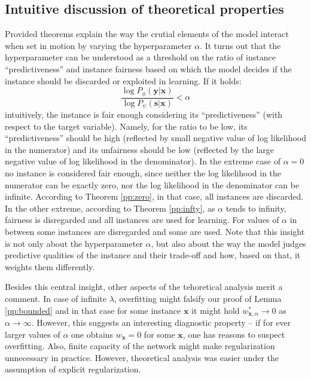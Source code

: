 \documentclass[preprint,12pt]{elsarticle}
\begin{document}
\subsection{Intuitive discussion of theoretical properties}

Provided theorems explain the way the crutial elements of the model interact when set in motion by varying the hyperparameter $\alpha$. It turns out that the hyperparameter can be understood as a threshold on the ratio of instance ``predictiveness'' and instance fairness based on which the model decides if the instance should be discarded or exploited in learning.
If it holds:
\begin{equation}
\frac{\log P_{\phi}(\mathbf{y}|\mathbf{x})}{\log P_{\psi}(\mathbf{s}|\mathbf{x})}<\alpha
\end{equation}
intuitively, the instance is fair enough considering its ``predictiveness'' (with respect to the target variable). Namely, for the ratio to be low, its ``predictiveness'' should be high (reflected by small negative value of log likelihood in the numerator) and its unfairness should be low (reflected by the large negative value of log likelihood in the denominator). In the extreme case of $\alpha=0$ no instance is considered fair enough, since neither the log likelihood in the numerator can be exactly zero, nor the log likelihood in the denominator can be infinite. According to Theorem \ref{pp:zero}, in that case, all instances are discarded. In the other extreme, according to Theorem \ref{pp:infty}, as $\alpha$ tends to infinity, fairness is disregarded and all instances are used for learning. For values of $\alpha$ in between some instances are disregarded and some are used. Note that this insight is not only about the hyperparameter $\alpha$, but also about the way the model judges predictive qualities of the instance and their trade-off and how, based on that, it weights them differently.

Besides this central insight, other aspects of the tehoretical analysis merit a comment. In case of infinite $\lambda$, overfitting might falsify our proof of Lemma \ref{pp:bounded} and in that case for some instance $\mathbf{x}$ it might hold $w^*_{\mathbf{x},\alpha}\rightarrow 0$ as $\alpha\rightarrow\infty$. However, this suggests an interesting diagnostic property -- if for ever larger values of $\alpha$ one obtains $w_\mathbf{x}=0$ for some $\mathbf{x}$, one has reasons to suspect overfitting. Also, finite capacity of the network might make regularization unnecessary in practice. However, theoretical analysis was easier under the assumption of explicit regularization.
\end{document}
